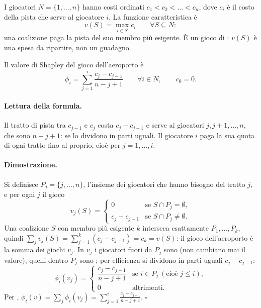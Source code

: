 \begin{definizione}
I giocatori $N = \{1, \dots, n\}$ hanno costi ordinati $c_1 < c_2 < \dots < c_n$, dove
$c_i$ è il costo della pista che serve al giocatore $i$. La funzione caratteristica è
\[
  v(S) = \max_{i \in S} c_i \qquad \forall S \subseteq N:
\]
una coalizione paga la pista del suo membro più esigente. È un gioco di : $v(S)$
è una spesa da ripartire, non un guadagno.
\end{definizione}

\begin{teorema}
Il valore di Shapley del gioco dell'aeroporto è
\[
  \phi_i = \sum_{j=1}^{i} \frac{c_j - c_{j-1}}{n - j + 1}
  \qquad \forall i \in N, \qquad c_0 = 0.
\]
\end{teorema}

\paragraph{Lettura della formula.}
Il tratto di pista tra $c_{j-1}$ e $c_j$ costa $c_j - c_{j-1}$ e serve ai giocatori
$j, j+1, \dots, n$, che sono $n - j + 1$: se lo dividono in parti uguali. Il giocatore $i$
paga la sua quota di ogni tratto fino al proprio, cioè per $j = 1, \dots, i$.

\paragraph{Dimostrazione.}
Si definisce $P_j = \{j, \dots, n\}$, l'insieme dei giocatori che hanno bisogno del tratto
$j$, e per ogni $j$ il gioco
\[
  v_j(S) = \begin{cases}
    0 & \text{se } S \cap P_j = \emptyset,\\
    c_j - c_{j-1} & \text{se } S \cap P_j \ne \emptyset.
  \end{cases}
\]
Una coalizione $S$ con membro più esigente $k$ interseca esattamente $P_1, \dots, P_k$,
quindi $\sum_j v_j(S) = \sum_{j=1}^{k} (c_j - c_{j-1}) = c_k = v(S)$: il gioco
dell'aeroporto è la somma dei giochi $v_j$. In $v_j$ i giocatori fuori da $P_j$ sono
 (non cambiano mai il valore), quelli dentro $P_j$ sono ; per
efficienza si dividono in parti uguali $c_j - c_{j-1}$:
\[
  \phi_i(v_j) = \begin{cases}
    \dfrac{c_j - c_{j-1}}{n - j + 1} & \text{se } i \in P_j \ (\text{cioè } j \le i),\\[2mm]
    0 & \text{altrimenti.}
  \end{cases}
\]
Per , $\phi_i(v) = \sum_j \phi_i(v_j) = \sum_{j=1}^{i}
\frac{c_j - c_{j-1}}{n-j+1}$. \hfill$\square$

